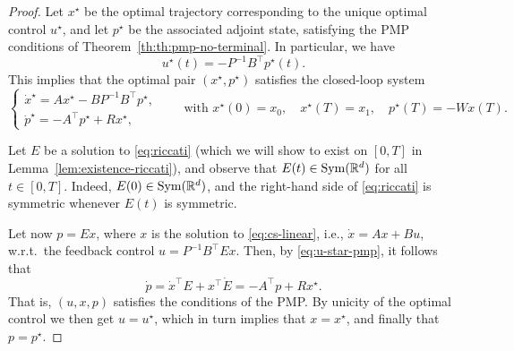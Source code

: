 \begin{proof}
    Let $x^\star$ be the optimal trajectory corresponding to the unique optimal control $u^\star$, and let $p^\star$ be the associated adjoint state, satisfying the PMP conditions of Theorem~\ref{th:th:pmp-no-terminal}.
    In particular, we have
    \begin{equation}
        \label{eq:u-star-pmp}
        u^\star(t) = -P^{-1} B^\top p^\star(t).
    \end{equation}
    This implies that the optimal pair $(x^\star,p^\star)$ satisfies the closed-loop system
    \begin{equation}
        \begin{cases}
            \dot x^\star = A x^\star - B P^{-1} B^\top p^\star, \\
            \dot p^\star = -A^\top p^\star + R x^\star,
        \end{cases}
        \qquad
        \text{with } x^\star(0)=x_0, \quad x^\star(T)=x_1, \quad p^\star(T)=-Wx(T).
    \end{equation}
    
    Let $E$ be a solution to \eqref{eq:riccati} (which we will show to exist on $[0,T]$ in Lemma~\ref{lem:existence-riccati}), and observe that $E(t)\in \operatorname{Sym}(\mathbb{R}^d)$ for all $t\in [0,T]$. 
    Indeed, $E(0)\in \operatorname{Sym}(\mathbb{R}^d)$, and the right-hand side of \eqref{eq:riccati} is symmetric whenever $E(t)$ is symmetric.
    
    Let now $p=E x$, where $x$ is the solution to \eqref{eq:cs-linear}, i.e., $\dot x = Ax+Bu$, w.r.t.~the feedback control $u=P^{-1}B^\top E x$.
    Then, by \eqref{eq:u-star-pmp}, it follows that 
    \begin{equation}
        \dot p = \dot x^\top E + x^\top \dot E 
        = -A^\top p + R x^\star.
    \end{equation}
    That is, $(u, x, p)$ satisfies the conditions of the PMP. By unicity of the optimal control we then get $u=u^\star$, which in turn implies that $x=x^\star$, and  finally that $p=p^\star$.


\end{proof}
